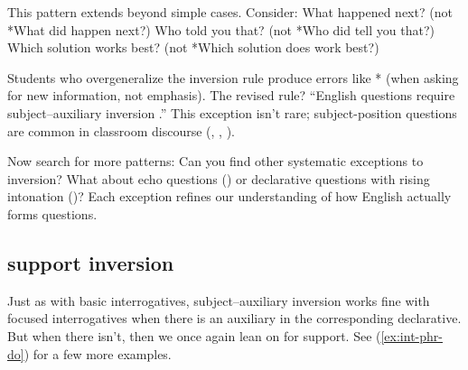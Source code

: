 This pattern extends beyond simple cases. Consider:
\ea What happened next? (not *What did happen next?)
\ex Who told you that? (not *Who did tell you that?)
\ex Which solution works best? (not *Which solution does work best?)
\z

Students who overgeneralize the inversion rule produce errors like * (when asking for new information, not emphasis). The revised rule? \enquote{English questions require subject--auxiliary inversion .} This exception isn't rare; subject-position questions are common in classroom discourse (, , ).

Now search for more patterns: Can you find other systematic exceptions to inversion? What about echo questions () or declarative questions with rising intonation ()? Each exception refines our understanding of how English actually forms questions.



\subsection{ support inversion}\label{sec:focused-do-support}

Just as with basic interrogatives, subject--auxiliary inversion works fine with focused interrogatives when there is an auxiliary in the corresponding declarative. But when there isn't, then we once again lean on  for support. See (\ref{ex:int-phr-do}) for a few more examples.

